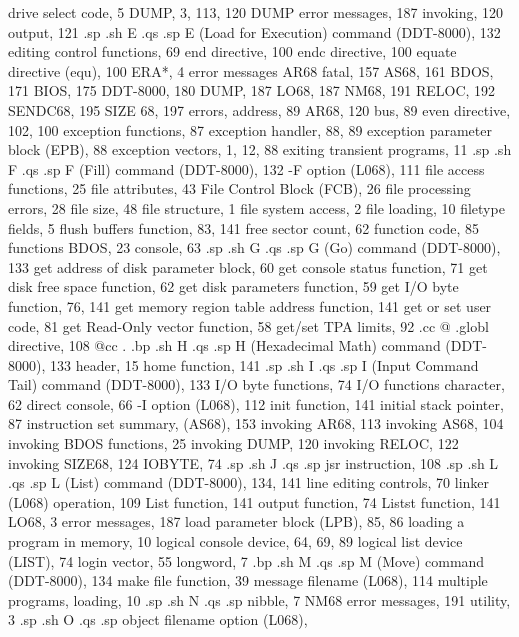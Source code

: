 drive select code, 5
DUMP, 3, 113, 120
DUMP 
  error messages, 187
  invoking, 120
  output, 121
.sp
.sh
E
.qs
.sp
E (Load for Execution) command 
    (DDT-8000), 132
editing control functions, 69
end directive, 100
endc directive, 100
equate directive (equ), 100
ERA*, 4
error messages
  AR68 fatal, 157
  AS68, 161
  BDOS, 171
  BIOS, 175
  DDT-8000, 180
  DUMP, 187
  LO68, 187
  NM68, 191
  RELOC, 192
  SENDC68, 195
  SIZE 68, 197
errors, 
address, 89
  AR68, 120
  bus, 89
even directive, 102, 100
exception functions, 87
exception handler, 88, 89
exception parameter block 
    (EPB), 88
exception vectors, 1, 12, 88
exiting transient programs, 11
.sp
.sh
F
.qs
.sp
F (Fill) command (DDT-8000), 
    132
-F option (L068), 111
file access functions, 25
file attributes, 43
File Control Block (FCB), 26 
file processing errors, 28
file size, 48
file structure, 1
file system access, 2
file loading, 10
filetype fields, 5
flush buffers function, 83, 141
free sector count, 62
function code, 85
functions
  BDOS, 23
  console, 63
.sp
.sh
G
.qs
.sp
G (Go) command (DDT-8000), 133
get address of disk parameter 
    block, 60
get console status function, 71
get disk free space function, 62
get disk parameters function, 59
get I/O byte function, 76, 141
get memory region table 
    address function, 141
get or set user code, 81
get Read-Only vector function, 
    58
get/set TPA limits, 92
.cc @
.globl directive, 108
@cc .
.bp
.sh
H
.qs
.sp
H (Hexadecimal Math) command 
    (DDT-8000), 133
header, 15
home function, 141
.sp
.sh
I
.qs
.sp
I (Input Command Tail) command 
    (DDT-8000), 133
I/O byte functions, 74
I/O functions
  character, 62
  direct console, 66
-I option (L068), 112
init function, 141
initial stack pointer, 87
instruction set summary, 
    (AS68), 153
invoking AR68, 113
invoking AS68, 104
invoking BDOS functions, 25
invoking DUMP, 120
invoking RELOC, 122
invoking SIZE68, 124
IOBYTE, 74
.sp
.sh
J
.qs
.sp
jsr instruction, 108
.sp
.sh
L
.qs
.sp
L (List) command (DDT-8000), 
    134, 141
line editing controls, 70
linker (L068) operation, 109
List 
  function, 141
  output function, 74
Listst function, 141
LO68, 3
  error messages, 187
load parameter block (LPB), 
    85, 86
loading a program in memory, 
    10
logical console device, 64, 
    69, 89
logical list device (LIST), 74
login vector, 55
longword, 7
.bp
.sh
M
.qs
.sp
M (Move) command (DDT-8000), 
    134
make file function, 39
message filename (L068), 114
multiple programs, loading, 10
.sp
.sh
N
.qs
.sp
nibble, 7
NM68 
  error messages, 191
  utility, 3
.sp
.sh
O
.qs
.sp
object filename option (L068), 

